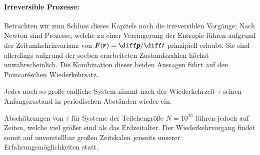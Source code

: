 \paragraph*{Irreversible Prozesse:} Betrachten wir zum Schluss dieses Kapitels noch die irreversiblen Vorgänge:
Nach Newton sind Prozesse, welche zu einer Verringerung der Entropie führen aufgrund der Zeitumkehrinvarianz von $\pmb{F}(\pmb{r})=\diff\pmb{p}/\diff t$ prinzipiell erlaubt. Sie sind allerdings aufgrund der soeben erarbeiteten Zustandszahlen höchst unwahrscheinlich. Die Kombination dieser beiden Aussagen führt auf den Poincaréschen Wiederkehrsatz.
\begin{formal}
     Jedes noch so große endliche System nimmt nach der Wiederkehrzeit $\tau$ seinen Anfangszustand in periodischen Abständen wieder ein. 
\end{formal}
Abschätzungen von $\tau$ für Systeme der Teilchengröße $N=10^{23}$ führen jedoch auf Zeiten, welche viel größer sind als das Erdzeitalter. Der Wiederkehrvorgang findet somit auf unvorstellbar großen Zeitskalen jenseits unserer Erfahrungsmöglichkeiten statt.
